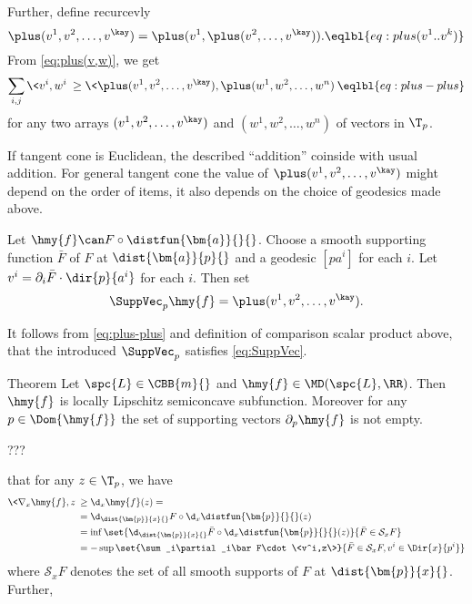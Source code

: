 Further, define recurcevly 
$$\plus(v^1,v^2,\dots,v^\kay)=\plus(v^1,\plus(v^2,\dots,v^\kay)).
\eqlbl{eq:plus(v^1..v^k)}$$
From \ref{eq:plus(v,w)}, we get
$$\sum_{i,j}\<v^i,w^i\>
\ge
\<\plus(v^1,v^2,\dots,v^\kay),\plus(w^1,w^2,\dots,w^n)\>\eqlbl{eq:plus-plus}$$
for any two arrays $(v^1,v^2,\dots,v^\kay)$ and $(w^1,w^2,\dots,w^n)$ of vectors in $\T_p$.

If tangent cone is Euclidean, the described ``addition'' coinside with usual addition.
For general tangent cone the value of $\plus(v^1,v^2,\dots,v^\kay)$ might depend on the order of items, it also depends on the choice of geodesics made above.


Let $\hmy{f}\can F\circ\distfun{\bm{a}}{}{}$.
Choose a smooth supporting function $\bar F$ of $F$ at 
$\dist{\bm{a}}{p}{}$ and a geodesic $[pa^i]$ for each $i$.
Let $v^i=\partial_i\bar F\cdot \dir{p}{a^i}$ for each $i$.
Then set 
$$\SuppVec_p\hmy{f}=\plus(v^1,v^2,\dots,v^\kay).$$

It follows from \ref{eq:plus-plus} and definition of comparison scalar product above,
that the introduced $\SuppVec_p$ satisfies \ref{eq:SuppVec}.
\qeds














\begin{thm}{Theorem}
Let $\spc{L}\in\CBB{m}{}$ and $\hmy{f}\in\MD(\spc{L},\RR)$.
Then $\hmy{f}$ is locally Lipschitz semiconcave subfunction.
Moreover for any $p\in\Dom{\hmy{f}}$ the set of supporting vectors $\partial_p\hmy{f}$ is not empty.
\end{thm}

???\qeds







that for any $z\in\T_p$, we have
\begin{align*}
\<\nabla_x\hmy{f},z\>
&\ge
\d_x\hmy{f}(z)=
\\
&=\d_{\dist{\bm{p}}{x}{}}F\circ\d_x\distfun{\bm{p}}{}{}(z)
\\
&=
\inf
\set{\d_{\dist{\bm{p}}{x}{}}\bar F\circ\d_x\distfun{\bm{p}}{}{}(z)}%
{\bar F\in\mathcal{S}_xF}
\\
&=
-\sup
\set{\sum_i\partial_i\bar F\cdot\<v^i,z\>}%
{\bar F\in\mathcal{S}_xF, v^i\in\Dir{x}{p^i}}
\end{align*}
where $\mathcal{S}_xF$ denotes the set of all smooth supports of $F$ at $\dist{\bm{p}}{x}{}$.
Further, 






